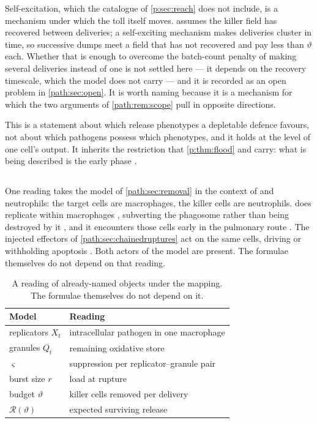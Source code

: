 Self-excitation, which the catalogue of \cref{p:sec:reach} does not
include, is a mechanism under which the toll itself moves.
 assumes the killer field has recovered between
deliveries; a self-exciting mechanism makes deliveries cluster in
time, so successive dumps meet a field that has not recovered and pay less
than $\vartheta$ each. Whether that is enough to overcome the batch-count
penalty of making several deliveries instead of one is not settled here ---
it depends on the recovery timescale, which the model does not carry --- and
it is recorded as an open problem in \cref{path:sec:open}. It is worth
naming because it is a mechanism for which the two
arguments of \cref{path:rem:scope} pull in opposite directions.

This is a statement about which release phenotypes a depletable defence
favours, not about which pathogens possess which phenotypes, and it holds
at the level of one cell's output. It inherits the restriction that
\cref{p:thm:flood} and \cite{pearson2011stochastic} carry: what is being
described is the early phase \cite{hataye2019principles}.

\subsection{\texorpdfstring{\yp{}}{Y. pestis}}
\label{path:sec:ypestis}

One reading takes the model of \cref{path:sec:removal} in the context of
\yp{} and neutrophils: the target cells are macrophages, the killer cells
are neutrophils. \yp{} does replicate within macrophages
\cite{PujolBliska2003,KeEtAl2013}, subverting the phagosome rather than
being destroyed by it \cite{ConnorEtAl2018,PujolBliska2005}, and it
encounters those cells early in the pulmonary route
\cite{BosioEtAl2005}. The injected effectors of
\cref{path:sec:chainedruptures} act on the same cells, driving or
withholding apoptosis
\cite{MonackEtAl1997,ZaubermanEtAl2006,PetersEtAl2013}. Both actors of the
model are present. The formulae themselves do not depend on that reading.

\begin{table}[!htbp]
\centering
\small
\begin{tabular}{@{}ll@{}}
\toprule
Model & Reading \\
\midrule
replicators $X_t$ & intracellular pathogen in one macrophage \\
granules $Q_t$ & remaining oxidative store \\
$\varsigma$ & suppression per replicator--granule pair \\
burst size $r$ & load at rupture \\
budget $\vartheta$ & killer cells removed per delivery \\
$\mathcal{R}(\vartheta)$ & expected surviving release \\
\bottomrule
\end{tabular}
\caption{A reading of already-named objects under the \yp{} mapping.
The formulae themselves do not depend on it.}
\label{path:tab:ypestis}
\end{table}

